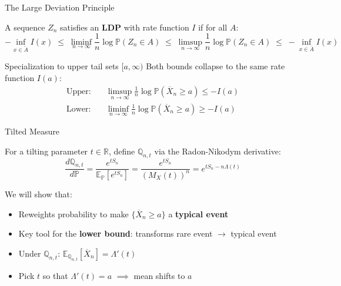 \documentclass[aspectratio=169]{beamer}
\newcommand{\E}{\mathbb{E}}
\renewcommand{\P}{\mathbb{P}}
\newcommand{\Q}{\mathbb{Q}}
\newcommand{\R}{\mathbb{R}}
\begin{document}
\begin{frame}{The Large Deviation Principle}
  \begin{definition}
    A sequence $Z_n$ satisfies an \textbf{LDP} with rate function $I$ if for all $A$:
    \[
      -\inf_{x \in \mathring{A}} I(x) \;\le\; \liminf_{n\to\infty} \frac{1}{n}\log\P(Z_n \in A) \;\le\; \limsup_{n\to\infty} \frac{1}{n}\log\P(Z_n \in A) \;\le\; -\inf_{x \in \overline{A}} I(x)
    \]
  \end{definition}

  \begin{block}{Specialization to upper tail sets $[a,\infty)$}
    Both bounds collapse to the same rate function $I(a)$:
    \begin{align*}
      \text{Upper:}\quad & \limsup_{n\to\infty} \frac{1}{n}\log\P(\overline{X}_n \ge a) \le -I(a) \\
      \text{Lower:}\quad & \liminf_{n\to\infty} \frac{1}{n}\log\P(\overline{X}_n \ge a) \ge -I(a)
    \end{align*}
  \end{block}
\end{frame}

\begin{frame}{Tilted Measure}
  \begin{definition}
    For a tilting parameter $t \in \R$, define $\Q_{n,t}$ via the Radon-Nikodym derivative:
    \[
      \frac{d\Q_{n,t}}{d\P} = \frac{e^{tS_n}}{\E_\P[e^{tS_n}]} = \frac{e^{tS_n}}{(M_X(t))^n} = e^{tS_n - n\Lambda(t)}
    \]
  \end{definition}
  \vspace{0.2cm}
  We will show that:
  \begin{itemize}
    \item Reweights probability to make $\{\overline{X}_n \ge a\}$ a \textbf{typical event}
    \item Key tool for the \textbf{lower bound}: transforms rare event $\to$ typical event
    \item Under $\Q_{n,t}$: $\E_{\Q_{n,t}}[\overline{X}_n] = \Lambda'(t)$
    \item Pick $t$ so that $\Lambda'(t) = a$ $\implies$ mean shifts to $a$
  \end{itemize}
\end{frame}
\end{document}
